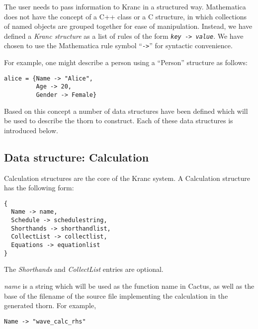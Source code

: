\documentclass{report}
\begin{document}
The user needs to pass information to Kranc in a structured way.
Mathematica does not have the concept of a C++ class or a C structure,
in which collections of named objects are grouped together for ease of
manipulation.  Instead, we have defined a {\em Kranc structure} as a
list of rules of the form {\tt {\it key} -> {\it value}}.  We have
chosen to use the Mathematica rule symbol ``{\tt ->}'' for syntactic
convenience.

For example, one might describe a person using a ``Person'' structure
as follows:

\begin{center}
\begin{minipage}{0.8 \textwidth}
\begin{verbatim}
alice = {Name -> "Alice",
         Age -> 20,
         Gender -> Female}
\end{verbatim}
\end{minipage}
\end{center}

Based on this concept a number of data structures have been defined
which will be used to describe the thorn to construct.  Each of these
data structures is introduced below.


\subsection{Data structure: Calculation}

Calculation structures are the core of the Kranc system. A Calculation
structure has the following form:

\begin{center}
\begin{minipage}{0.8 \textwidth}
\begin{verbatim}
{
  Name -> name,
  Schedule -> schedulestring,
  Shorthands -> shorthandlist,
  CollectList -> collectlist,
  Equations -> equationlist
}
\end{verbatim}
\end{minipage}
\end{center}

The {\it Shorthands} and {\it CollectList} entries are optional.

{\it name} is a string which will be used as the function name in
Cactus, as well as the base of the filename of the source file
implementing the calculation in the generated thorn. For example, 

\begin{center}
\begin{minipage}{0.8 \textwidth}
\begin{verbatim}
Name -> "wave_calc_rhs"
\end{verbatim}
\end{minipage}
\end{center}
\end{document}
